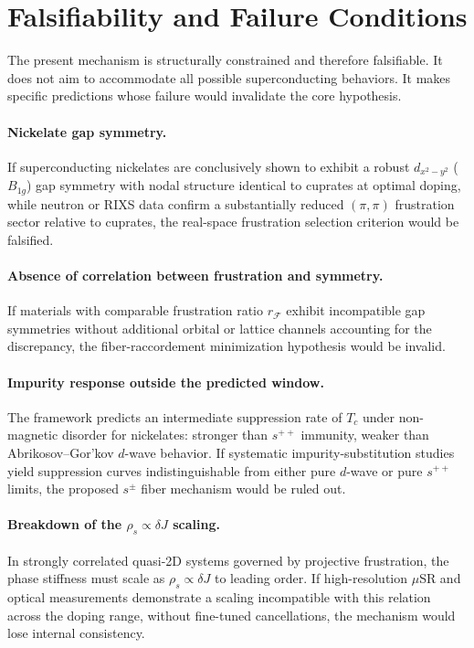 \section{Falsifiability and Failure Conditions}
  \label{sec:falsifiability}

  The present mechanism is structurally constrained and therefore falsifiable.
  It does not aim to accommodate all possible superconducting behaviors.
  It makes specific predictions whose failure would invalidate the core hypothesis.

  \paragraph{Nickelate gap symmetry.}
    If superconducting nickelates are conclusively shown to exhibit a robust
    $d_{x^2-y^2}$ ($B_{1g}$) gap symmetry with nodal structure identical to
    cuprates at optimal doping, while neutron or RIXS data confirm a substantially
    reduced $(\pi,\pi)$ frustration sector relative to cuprates, the
    real-space frustration selection criterion would be falsified.

  \paragraph{Absence of correlation between frustration and symmetry.}
    If materials with comparable frustration ratio $r_{\mathcal{F}}$ exhibit
    incompatible gap symmetries without additional orbital or lattice channels
    accounting for the discrepancy, the fiber-raccordement minimization hypothesis
    would be invalid.

  \paragraph{Impurity response outside the predicted window.}
    The framework predicts an intermediate suppression rate of $T_c$ under
    non-magnetic disorder for nickelates: stronger than $s^{++}$ immunity,
    weaker than Abrikosov--Gor'kov $d$-wave behavior.
    If systematic impurity-substitution studies yield suppression curves
    indistinguishable from either pure $d$-wave or pure $s^{++}$ limits,
    the proposed $s^\pm$ fiber mechanism would be ruled out.

  \paragraph{Breakdown of the $\rho_s \propto \delta J$ scaling.}
    In strongly correlated quasi-2D systems governed by projective frustration,
    the phase stiffness must scale as $\rho_s \propto \delta J$ to leading order.
    If high-resolution $\mu$SR and optical measurements demonstrate a scaling
    incompatible with this relation across the doping range, without
    fine-tuned cancellations, the mechanism would lose internal consistency.

